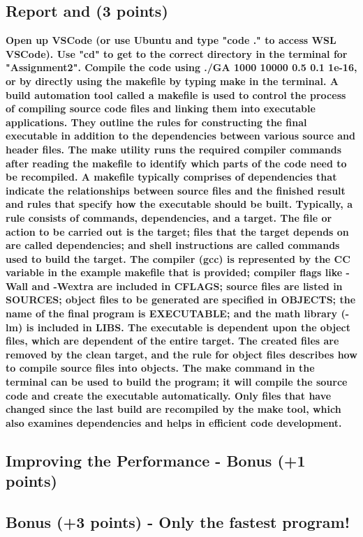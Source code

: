 	
	\subsection{Report and  (3 points)}
	
    \textbf{Open up VSCode (or use Ubuntu and type "code ." to access WSL VSCode). Use "cd" to get to the correct directory in the terminal for "Assignment2". Compile the code using ./GA 1000 10000 0.5 0.1 1e-16, or by directly using the makefile by typing make in the terminal. A build automation tool called a makefile is used to control the process of compiling source code files and linking them into executable applications. They outline the rules for constructing the final executable in addition to the dependencies between various source and header files. The make utility runs the required compiler commands after reading the makefile to identify which parts of the code need to be recompiled. A makefile typically comprises of dependencies that indicate the relationships between source files and the finished result and rules that specify how the executable should be built. Typically, a rule consists of commands, dependencies, and a target. The file or action to be carried out is the target; files that the target depends on are called dependencies; and shell instructions are called commands used to build the target. The compiler (gcc) is represented by the CC variable in the example makefile that is provided; compiler flags like -Wall and -Wextra are included in CFLAGS; source files are listed in SOURCES; object files to be generated are specified in OBJECTS; the name of the final program is EXECUTABLE; and the math library (-lm) is included in LIBS. The executable is dependent upon the object files, which are dependent of the entire target. The created files are removed by the clean target, and the rule for object files describes how to compile source files into objects. The make command in the terminal can be used to build the program; it will compile the source code and create the executable automatically. Only files that have changed since the last build are recompiled by the make tool, which also examines dependencies and helps in efficient code development.}
	
	\subsection{Improving the Performance - Bonus (+1 points)}
		
	
	\subsection{Bonus (+3 points) - Only the fastest program!}

	
	
